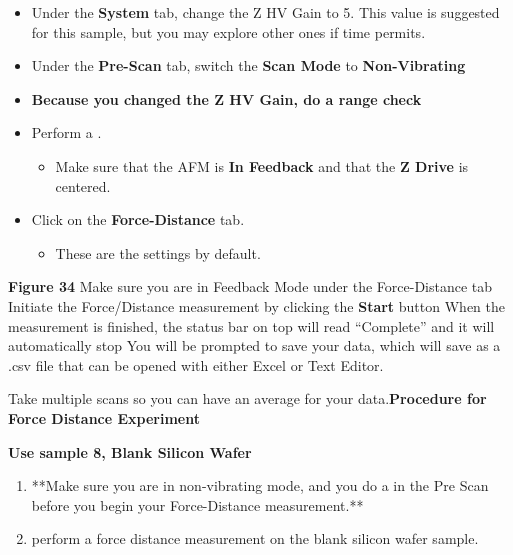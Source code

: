 \documentclass{../lab}
\begin{document}
{\begin{itemize}
        \item Under the \textbf{System} tab, change the Z HV Gain to 5.  This value is suggested for this sample, but you may explore other ones if time permits.

        \item Under the \textbf{Pre-Scan} tab, switch the \textbf{Scan Mode} to \textbf{Non-Vibrating}

        \item \textbf{Because you changed the Z HV Gain, do a range check}

        \item Perform a .

        \begin{itemize}
            \item Make sure that the AFM is \textbf{In Feedback} and that the \textbf{Z Drive} is centered.

        \end{itemize}

        \item Click on the \textbf{Force-Distance} tab.

        \begin{itemize}
            \item These are the settings by default.

        \end{itemize}

    \end{itemize}


\textbf{Figure 34}
Make sure you are in Feedback Mode under the Force-Distance tab
Initiate the Force/Distance measurement by clicking the \textbf{Start} button
When the measurement is finished, the status bar on top will read ``Complete'' and it will automatically stop
You will be prompted to save your data, which will save as a .csv file that can be opened with either Excel or Text Editor.

Take multiple scans so you can have an average for your data.\textbf{Procedure for Force Distance Experiment}

\textbf{Use sample 8, Blank Silicon Wafer}

\begin{enumerate}
    \item **Make sure you are in non-vibrating mode, and you do a  in the Pre Scan before you begin your Force-Distance measurement.**

    \item perform a force distance measurement on the blank silicon wafer sample.


\end{enumerate}}
\end{document}
